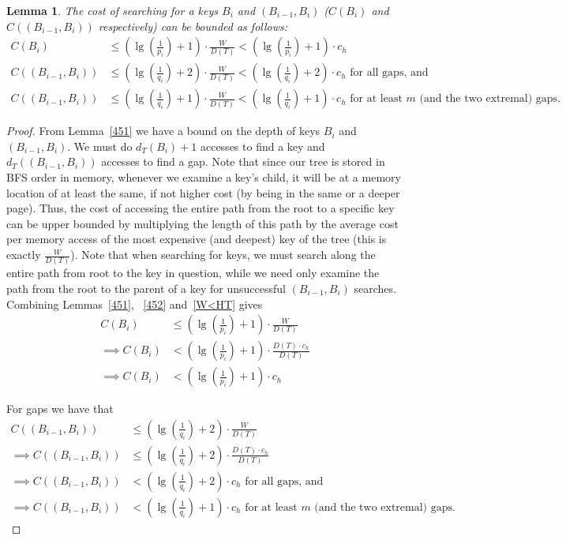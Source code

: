 \documentclass[letterpaper,12pt,titlepage,oneside,final]{book}
\theoremstyle{plain}
\newtheorem{lem}[thm]{Lemma}
\begin{document}
\begin{lem}
The cost of searching for a keys $B_i$ and $(B_{i-1},B_i)$ ($C(B_i)$ and $C((B_{i-1},B_i))$ respectively) can be bounded as follows: 
\begin{align*} 
C(B_i) &\leq (\lg(\frac{1}{p_i})+1)\cdot \frac{W}{D(T)} < (\lg(\frac{1}{p_i})+1)\cdot c_h \\
C((B_{i-1},B_i)) &\leq (\lg(\frac{1}{q_i})+2)\cdot \frac{W}{D(T)} < (\lg(\frac{1}{q_i})+2)\cdot c_h \text{ for all gaps, and} \\
C((B_{i-1},B_i)) &\leq (\lg(\frac{1}{q_i})+1)\cdot \frac{W}{D(T)} < (\lg(\frac{1}{q_i})+1)\cdot c_h \text{ for at least $m$ (and the two extremal) gaps}.
\end{align*}

\end{lem}

\begin{proof}
From Lemma~\ref{451} we have a bound on the depth of keys $B_i$ and $(B_{i-1},B_i)$. We must do $d_T(B_i) + 1$ accesses to find a key and $d_T((B_{i-1},B_i))$ accesses to find a gap. Note that since our tree is stored in BFS order in memory, whenever we examine a key's child, it will be at a memory location of at least the same, if not higher cost (by being in the same or a deeper page). Thus, the cost of accessing the entire path from the root to a specific key can be upper bounded by multiplying the length of this path by the average cost per memory access of the most expensive (and deepest) key of the tree (this is exactly $\frac{W}{D(T)}$). Note that when searching for keys, we must search along the entire path from root to the key in question, while we need only examine the path from the root to the parent of a key for unsuccessful $(B_{i-1},B_i)$ searches. Combining Lemmas~\ref{451}, ~\ref{452} and~\ref{W<HT} gives
\begin{align*}
C(B_i) &\leq (\lg(\frac{1}{p_i})+1)\cdot\frac{W}{D(T)}\\
\implies C(B_i) &< (\lg(\frac{1}{p_i})+1)\cdot\frac{D(T)\cdot c_h}{D(T)}   \\
\implies C(B_i) &< (\lg(\frac{1}{p_i})+1)\cdot c_h
\end{align*}

For gaps we have that
\begin{align*}
C((B_{i-1},B_i)) &\leq (\lg(\frac{1}{q_i})+2)\cdot \frac{W}{D(T)}   \\
\implies C((B_{i-1},B_i)) &\leq (\lg(\frac{1}{q_i})+2)\cdot \frac{D(T)\cdot c_h}{D(T)}   \\
\implies C((B_{i-1},B_i)) &< (\lg(\frac{1}{q_i})+2)\cdot c_h \text{ for all gaps, and} \\
\implies C((B_{i-1},B_i)) &< (\lg(\frac{1}{q_i})+1)\cdot c_h \text{ for at least $m$ (and the two extremal) gaps}.
\end{align*}
\end{proof}
\end{document}
